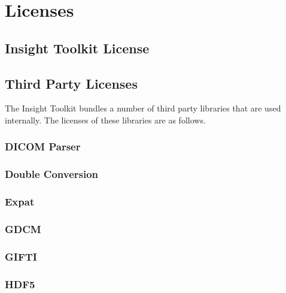 \chapter{Licenses}

\section{Insight Toolkit License}
\label{sec:InsightToolkitLicense}



\section{Third Party Licenses}
The Insight Toolkit bundles a number of third party libraries that are used
internally.  The licenses of these libraries are as follows.

\subsection{DICOM Parser}


\subsection{Double Conversion}


\subsection{Expat}


\subsection{GDCM}


\subsection{GIFTI}


\subsection{HDF5}


